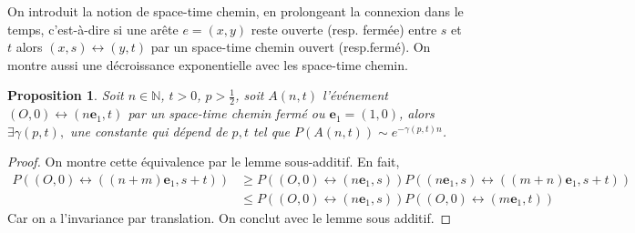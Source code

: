 \documentclass[titlepage,a4paper,11pt]{article}
\newcounter{prop}
\newtheorem{stc}[prop]{Proposition}
\newtheorem{tension}[prop]{Proposition}
\newcommand{\connect}{\leftrightarrow}
\begin{document}
On introduit la notion de space-time chemin, en prolongeant la connexion dans le temps, c'est-à-dire si une arête $e=(x,y)$ reste ouverte (resp. fermée) entre $s$ et $t$ alors $(x,s)\connect (y,t)$ par un space-time chemin ouvert (resp.fermé). On montre aussi une décroissance exponentielle avec les space-time chemin.

\begin{stc} \label{stc} Soit $n\in \mathbb{N}$, $t>0$, $p> \frac{1}{2}$, soit $ A(n,t)$ l'événement $(O,0) \connect (n\mathbf{e}_1,t)$ par un space-time chemin fermé ou $\mathbf{e}_1 = (1,0)$, alors $\exists \gamma(p,t),$ une constante qui dépend de $p,t$ tel que $P(A(n,t)) \sim e^{-\gamma(p,t)n}$.
\end{stc}

\begin{proof}
On montre cette équivalence par le lemme sous-additif. En fait, 
\begin{align*}
P((O,0)\connect ((n+m)\mathbf{e}_1,s+t)) &\geqslant P((O,0)\connect (n\mathbf{e}_1,s))P((n\mathbf{e}_1,s)\connect ((m+n)\mathbf{e}_1,s+t))\\
& \leqslant P((O,0)\connect (n\mathbf{e}_1,s))P((O,0)\connect (m\mathbf{e}_1,t))
\end{align*}
Car on a l'invariance par translation. On conclut avec le lemme sous additif.
\end{proof}

\begin{comment}
On étudie la constante $\gamma(p,t)$ et on a la proposition suivante:
\begin{tension}$\frac{\gamma(p,t)}{\gamma(p,0)} \rightarrow 1$ quand $p\rightarrow 1$.
\end{tension}
\begin{proof}
On utilise le fait que $\lim_n \frac{1}{n}\ln P(O\connect n\mathbf{e}_1) = \lim_n \frac{1}{n}\ln P(O\connect \partial \Lambda_n)$ et on considère une boite de taille $n$. On remarque le nombre d'arête qui se ferme entre $[0,t]$ est borné par une loi de Poisson de paramètre $n^2(1-p)t$. On note $N$ le nombre de bout d'un space-time chemin, c'est-à-dire le nombre de chemins fermés tel que $$ (O,0) = (x_1,t_1) \connect (x_1,t_2) \connect (x_2,t_2)\dots \connect (x_N,t_N) \connect (\partial\Lambda_n,t).
$$
On a donc $N$ est borné par une variable aléatoire de loi de Poisson de paramètre $n^2(1-p)t$. Quand $p\rightarrow 1$, on peut rendre $N$ d'ordre de 1 avec une probabilité proche de 1 et on a le résultat.
\end{proof}
\end{comment}
\end{document}
